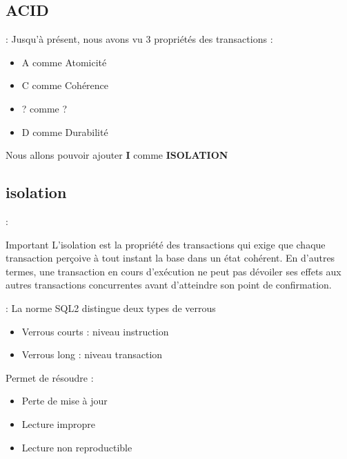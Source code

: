 \documentclass[10pt]{beamer}
\begin{document}
\subsection{ACID}
\begin{frame}{\secname : \subsecname}
    Jusqu'à présent, nous avons vu 3 propriétés des transactions :
    \begin{itemize}
        \item A	comme Atomicité
        \item C	comme Cohérence
        \item ?	comme ?
        \item D	comme Durabilité
    \end{itemize}
    Nous allons pouvoir ajouter \textbf{I} comme \textbf{ISOLATION}
\end{frame}

\subsection{isolation}
\begin{frame}{\secname : \subsecname}
    \begin{alertblock}{Important}
        L'isolation est la propriété des transactions qui exige que chaque transaction perçoive à tout instant la base dans un état cohérent.
        En d'autres termes, une transaction en cours d'exécution ne peut pas dévoiler ses effets aux autres transactions concurrentes avant d'atteindre son point de confirmation.
    \end{alertblock}
\end{frame}

\begin{frame}{\secname : \subsecname}
    La norme SQL2 distingue deux types de verrous
    \begin{itemize}
        \item Verrous courts : niveau instruction
        \item Verrous long : niveau transaction
    \end{itemize}
    Permet de résoudre :
    \begin{itemize}
        \item Perte de mise à jour
        \item Lecture impropre
        \item Lecture non reproductible
    \end{itemize}
\end{frame}
\end{document}
